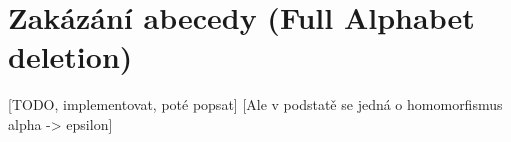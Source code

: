 \section{Zakázání abecedy (Full Alphabet deletion)}
[TODO, implementovat, poté popsat]
[Ale v podstatě se jedná o homomorfismus alpha -> epsilon]